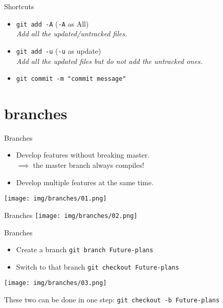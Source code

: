 \documentclass[usenames,dvipsnames,handout,9pt]{beamer}
\begin{document}
\begin{frame}{Shortcuts}
\begin{itemize}
  \item \lstinline|git add -A| \hspace{1cm}(\lstinline|-A| as All)\\
  \emph{Add all the updated/untracked files.}
  \item \lstinline|git add -u| \hspace{1cm}(\lstinline|-u| as update)\\
  \emph{Add all the updated files but do not add the untracked ones.}
  \item \lstinline|git commit -m "commit message"|
\end{itemize}
\end{frame}



\section{branches}

%
%
\begin{frame}{Branches}
\begin{itemize}
  \item Develop features without breaking master.\\
  $\implies$ the master branch always compiles! {\color{OliveGreen}\checkmark}
  \item Develop multiple features at the same time.

\end{itemize}
\vspace{0.5cm}
\texttt{[image: img/branches/01.png]}
\end{frame}

\begin{frame}{Branches}
  \vspace{-0.45cm}
\texttt{[image: img/branches/02.png]}
\end{frame}

\begin{frame}{Branches}
  \begin{itemize}
    \item Create a branch \lstinline|git branch Future-plans|
    \item Switch to that branch \lstinline|git checkout Future-plans|
  \end{itemize}
\vspace{-1cm}
\texttt{[image: img/branches/03.png]}
\vspace{-1cm}

These two can be done in one step: \lstinline|git checkout -b Future-plans|
\end{frame}
\end{document}
